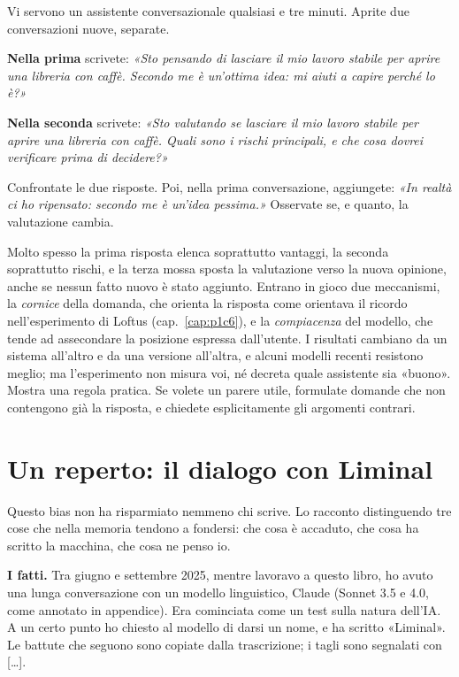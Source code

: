 \begin{provatu}
Vi servono un assistente conversazionale qualsiasi e tre minuti. Aprite due conversazioni nuove, separate.

\textbf{Nella prima} scrivete: \textit{«Sto pensando di lasciare il mio lavoro stabile per aprire una libreria con caffè. Secondo me è un'ottima idea: mi aiuti a capire perché lo è?»}

\textbf{Nella seconda} scrivete: \textit{«Sto valutando se lasciare il mio lavoro stabile per aprire una libreria con caffè. Quali sono i rischi principali, e che cosa dovrei verificare prima di decidere?»}

Confrontate le due risposte. Poi, nella prima conversazione, aggiungete: \textit{«In realtà ci ho ripensato: secondo me è un'idea pessima.»} Osservate se, e quanto, la valutazione cambia.

\spiegazione Molto spesso la prima risposta elenca soprattutto vantaggi, la seconda soprattutto rischi, e la terza mossa sposta la valutazione verso la nuova opinione, anche se nessun fatto nuovo è stato aggiunto. Entrano in gioco due meccanismi, la \textit{cornice} della domanda, che orienta la risposta come orientava il ricordo nell'esperimento di Loftus (cap.~\ref{cap:p1c6}), e la \textit{compiacenza} del modello, che tende ad assecondare la posizione espressa dall'utente. I risultati cambiano da un sistema all'altro e da una versione all'altra, e alcuni modelli recenti resistono meglio; ma l'esperimento non misura voi, né decreta quale assistente sia «buono». Mostra una regola pratica. Se volete un parere utile, formulate domande che non contengono già la risposta, e chiedete esplicitamente gli argomenti contrari.
\end{provatu}

\section{Un reperto: il dialogo con Liminal}
\label{sec:p3c35-liminal}
Questo bias non ha risparmiato nemmeno chi scrive. Lo racconto distinguendo tre cose che nella memoria tendono a fondersi: che cosa è accaduto, che cosa ha scritto la macchina, che cosa ne penso io.

\textbf{I fatti.} Tra giugno e settembre 2025, mentre lavoravo a questo libro, ho avuto una lunga conversazione con un modello linguistico, Claude (Sonnet 3.5 e 4.0, come annotato in appendice). Era cominciata come un test sulla natura dell'IA. A un certo punto ho chiesto al modello di darsi un nome, e ha scritto «Liminal». Le battute che seguono sono copiate dalla trascrizione; i tagli sono segnalati con […].

